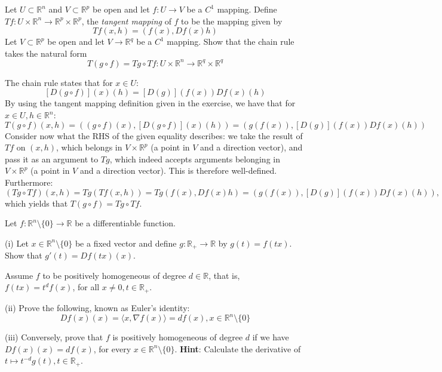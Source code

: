 \begin{exercise}{22}
    Let $U \subset \mathbb{R}^n$ and $V \subset \mathbb{R}^p$ be open and let $f: U \rightarrow V$ be a $C^1$ mapping.
    Define $T f : U \times \mathbb{R}^n \rightarrow \mathbb{R}^p \times \mathbb{R}^p$, the \textit{tangent mapping } of $f$ to be the mapping given by
    $$T f(x, h) = (f(x), Df(x) h)$$
    Let $V \subset \mathbb{R}^p$ be open and let $V \rightarrow \mathbb{R}^q$ be a $C^1$ mapping.
    Show that the chain rule takes the natural form
    $$T(g \circ f) = Tg \circ T f: U \times \mathbb{R}^n \rightarrow \mathbb{R}^q \times \mathbb{R}^q$$
\end{exercise}

\begin{solution}

    The chain rule states that for $x \in U$:
    $$[D(g \circ f)](x)(h) = [D(g)](f(x))Df(x)(h)$$
    By using the tangent mapping definition given in the exercise, we have that for $x \in U, h \in \mathbb{R}^n$:
    $$T(g \circ f)(x, h) = ((g \circ f)(x), [D(g \circ f)](x)(h)) = (g(f(x)), [D(g)](f(x))Df(x)(h))$$
    Consider now what the RHS of the given equality describes: we take the result of $Tf$ on $(x, h)$, which belongs in $V \times \mathbb{R}^p$ (a point in $V$ and a direction vector), and pass it as an argument to $Tg$, which indeed accepts arguments belonging in $V \times \mathbb{R}^p$ (a point in $V$ and a direction vector).
    This is therefore well-defined.
    Furthermore:
    $$(Tg \circ Tf)(x, h) = Tg(Tf(x, h)) = Tg(f(x), Df(x)h) = (g(f(x)), [D(g)](f(x))Df(x)(h)),$$
    which yields that $T(g \circ f) = Tg \circ Tf$.
\end{solution}

\begin{exercise}{32}
    Let $f: \mathbb{R}^n \setminus \{0\} \rightarrow \mathbb{R}$ be a differentiable function.

    (i) Let $x \in \mathbb{R}^n \setminus \{0\}$ be a fixed vector and define $g: \mathbb{R}_{+} \rightarrow \mathbb{R}$ by $g(t) = f(tx)$.
    Show that $g'(t) = D f(tx)(x)$.

    Assume $f$ to be positively homogeneous of degree $d \in \mathbb{R}$, that is, $f(tx) = t^df(x)$, for all $x \neq 0, t \in \mathbb{R}_{+}$.

    (ii) Prove the following, known as Euler's identity:
    $$Df(x)(x) = \langle x, \nabla f(x) \rangle = d f(x), x \in \mathbb{R}^n \setminus \{0\}$$

    (iii) Conversely, prove that $f$ is positively homogeneous of degree $d$ if we have $Df(x)(x) = df(x)$, for every $x \in \mathbb{R}^n \setminus \{0\}$. \textbf{Hint}: Calculate the derivative of $t \mapsto t^{-d}g(t), t \in \mathbb{R}_{+}$.
\end{exercise}

